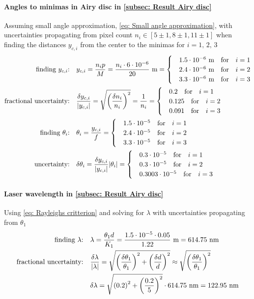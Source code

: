 \documentclass{emulateapj}
\begin{document}
\begin{appendices}
\paragraph{Angles to minimas in Airy disc in \cref{subsec: Result Airy disc}} Assuming small angle approximation, \cref{eq: Small angle approximation}, with uncertainties propagating from pixel count $n_i \in [5 \pm 1,8 \pm 1,11 \pm 1]$ when finding the distances $y_{c,i}$ from the center to the minimas for $i = 1,\, 2,\, 3$
\begin{align*}
\qq*{finding $y_{c,i}$:} & y_{c,i} = \frac{n_i p}{M} = \frac{n_i \cdot 6 \cdot 10^{-6}}{20} \text{ m} = 
\begin{cases}
& 1.5 \cdot 10^{-6} \text{ m} \qfor i = 1
\\
& 2.4 \cdot 10^{-6} \text{ m} \qfor i = 2
\\
& 3.3 \cdot 10^{-6} \text{ m} \qfor i = 3
\end{cases}
\\
\qq*{fractional uncertainty:} & \frac{\delta y_{c,i}}{\abs{y_{c,i}}} =  \sqrt{ \qty(\frac{\delta n_i}{n_i})^2 } = \frac{1}{n_i} = 
\begin{cases}
& 0.2 \qfor i = 1
\\
& 0.125 \qfor i = 2
\\
& 0.091 \qfor i = 3
\end{cases}
\\
\qq*{finding $\theta_{i}$:} & \theta_i = \frac{y_{c,i}}{f} =
\begin{cases}
& 1.5 \cdot 10^{-5} \qfor i = 1
\\
& 2.4 \cdot 10^{-5}  \qfor i = 2
\\
& 3.3 \cdot 10^{-5}\qfor i = 3
\end{cases}
\\
\qq*{uncertainty:} & \delta \theta_i = \frac{\delta y_{c,i}}{\abs{y_{c,i}}} \abs{\theta_i} = 
\begin{cases}
& 0.3 \cdot 10^{-5} \qfor i = 1
\\
& 0.3 \cdot 10^{-5}  \qfor i = 2
\\
& 0.3003 \cdot 10^{-5}\qfor i = 3
\end{cases}
\end{align*}

\paragraph{Laser wavelength in \cref{subsec: Result Airy disc}} Using \cref{eq: Rayleighs critterion} and solving for $\lambda$ with uncertainties propagating from $\theta_1$
\begin{align*}
\qq*{finding $\lambda$:} & \lambda = \frac{\theta_1 d}{K_1} = \frac{1.5\cdot 10^{-5} \cdot 0.05}{1.22} \text{ m} = 614.75 \text{ nm}
\\
\qq*{fractional uncertainty:} & \frac{\delta \lambda}{\abs{\lambda}} =  \sqrt{ \qty(\frac{\delta \theta_1}{\theta_1})^2 + \qty(\frac{\delta d}{d})^2 } \approx \sqrt{ \qty(\frac{\delta \theta_1}{\theta_1})^2}
\\
& \delta \lambda = \sqrt{ \qty(0.2)^2 + \qty(\frac{0.2}{5})^2 } \cdot 614.75 \text{ nm} = 122.95 \text{ nm}
\end{align*}


\end{appendices}
\end{document}
